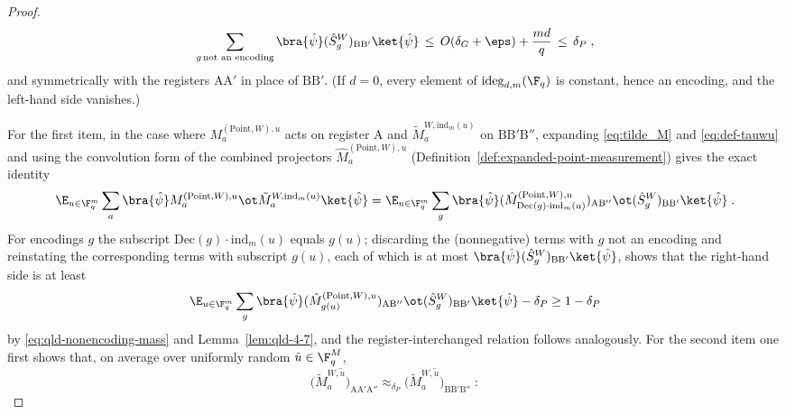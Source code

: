 \begin{proof}
	\begin{equation}\label{eq:qld-nonencoding-mass}
	\sum_{g \,\text{not an encoding}} \bra{\hat\psi} (\hat{S}^W_g)_{\mathrm{B}\mathrm{B}'} \ket{\hat\psi} \,\leq\, O(\delta_G + \eps) + \frac{md}{q} \,\leq\, \delta_P\;,
	\end{equation}
	and symmetrically with the registers $\mathrm{A}\mathrm{A}'$ in place of $\mathrm{B}\mathrm{B}'$. (If $d = 0$, every element of $\mathrm{ideg}_{d,m}(\F_q)$ is constant, hence an encoding, and the left-hand side vanishes.)

	For the first item, in the case where $M^{(\mathrm{Point},W),u}_a$ acts on register $\mathrm{A}$ and $\tilde{M}^{W,\mathrm{ind}_m(u)}_a$ on $\mathrm{B}\mathrm{B}'\mathrm{B}''$, expanding \eqref{eq:tilde_M} and \eqref{eq:def-tauwu} and using the convolution form of the combined projectors $\hat{M}^{(\mathrm{Point},W),u}_a$ (Definition~\ref{def:expanded-point-measurement}) gives the exact identity
	\[
		\E_{u \in \F_q^m} \sum_a \bra{\hat\psi} M^{(\mathrm{Point},W),u}_a \ot \tilde{M}^{W,\mathrm{ind}_m(u)}_a \ket{\hat\psi}
		= \E_{u \in \F_q^m} \sum_g \bra{\hat\psi} (\hat{M}^{(\mathrm{Point},W),u}_{\mathrm{Dec}(g) \cdot \mathrm{ind}_m(u)})_{\mathrm{A}\mathrm{B}''} \ot (\hat{S}^W_g)_{\mathrm{B}\mathrm{B}'} \ket{\hat\psi}\;.
	\]
	For encodings $g$ the subscript $\mathrm{Dec}(g) \cdot \mathrm{ind}_m(u)$ equals $g(u)$; discarding the (nonnegative) terms with $g$ not an encoding and reinstating the corresponding terms with subscript $g(u)$, each of which is at most $\bra{\hat\psi} (\hat{S}^W_g)_{\mathrm{B}\mathrm{B}'} \ket{\hat\psi}$, shows that the right-hand side is at least
	\[
		\E_{u \in \F_q^m} \sum_g \bra{\hat\psi} (\hat{M}^{(\mathrm{Point},W),u}_{g(u)})_{\mathrm{A}\mathrm{B}''} \ot (\hat{S}^W_g)_{\mathrm{B}\mathrm{B}'} \ket{\hat\psi} - \delta_P
		\geq 1 - \delta_P
	\]
	by \eqref{eq:qld-nonencoding-mass} and Lemma~\ref{lem:qld-4-7}, and the register-interchanged relation follows analogously. For the second item one first shows that, on average over uniformly random $\tilde{u} \in \F_q^M$,
	\begin{equation}\label{eq:qld-pulling-cons}
		\bigl( \tilde{M}^{W,\tilde{u}}_a \bigr)_{\mathrm{A}\mathrm{A}'\mathrm{A}''} \approx_{\delta_P} \bigl( \tilde{M}^{W,\tilde{u}}_a \bigr)_{\mathrm{B}\mathrm{B}'\mathrm{B}''}\;:
	\end{equation}

\end{proof}
